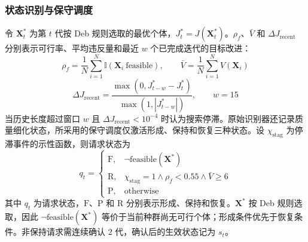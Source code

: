 \subsubsection{状态识别与保守调度}

令 $\mathbf X_t^*$ 为第 $t$ 代按 Deb 规则选取的最优个体，$J_t^*=J(\mathbf X_t^*)$。$\rho_f$、$\bar{V}$ 和 $\Delta J_{\mathrm{recent}}$ 分别表示可行率、平均违反量和最近 $w$ 个已完成迭代的目标改进：
\begin{equation}
    \rho_f=\frac{1}{N}\sum_{i=1}^{N}\mathbb I(\mathbf X_i\ \mathrm{feasible}),
    \qquad
    \bar V=\frac{1}{N}\sum_{i=1}^{N}V(\mathbf X_i)
    \label{eq:state-feasibility}
\end{equation}
\begin{equation}
    \Delta J_{\mathrm{recent}}=
    \frac{\max(0,J^*_{t-w}-J^*_{t})}{\max(1,|J^*_{t-w}|)} ,
    \qquad w=15
    \label{eq:recent-improvement}
\end{equation}
当历史长度超过窗口 $w$ 且 $\Delta J_{\mathrm{recent}}<10^{-4}$ 时认为搜索停滞。原始识别器还记录质量细化状态，所采用的保守调度仅激活形成、保持和恢复三种状态。设 $\chi_{\mathrm{stag}}$ 为停滞事件的示性函数，则请求状态为
\begin{equation}
    q_t=
    \begin{cases}
    \mathrm{F}, & \neg\mathrm{feasible}(\mathbf X^*)\\
    \mathrm{R}, & \chi_{\mathrm{stag}}=1\land\rho_f<0.55\land\bar V\geq6\\
    \mathrm{P}, & \mathrm{otherwise}
    \end{cases}
    \label{eq:conservative-state}
\end{equation}
其中 $q_t$ 为请求状态，$\mathrm{F}$、$\mathrm{P}$ 和 $\mathrm{R}$ 分别表示形成、保持和恢复。$\mathbf X^*$ 按 Deb 规则选取，因此 $\neg\mathrm{feasible}(\mathbf X^*)$ 等价于当前种群尚无可行个体；形成条件优先于恢复条件。非保持请求需连续确认 $2$ 代，确认后的生效状态记为 $s_t$。

